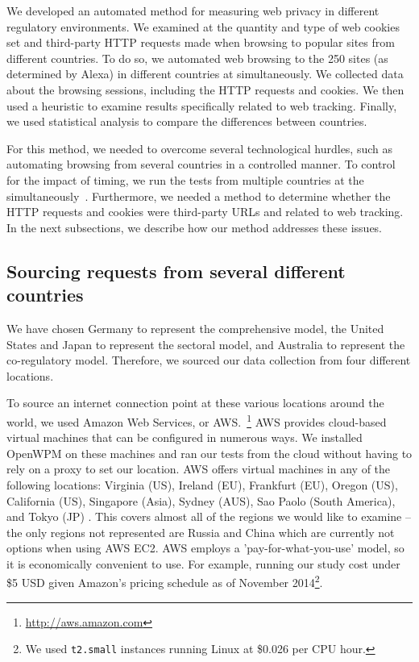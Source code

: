 \documentclass[conference]{IEEEtran}
\newcommand{\todo}[1]{}
\renewcommand{\todo}[1]{{\color{red} TODO: {#1}}}
\begin{document}
We developed an automated method for measuring web privacy in different regulatory environments.  We examined at the quantity and type of web cookies set and third-party HTTP requests made when browsing to popular sites from different countries.  To do so, we automated web browsing to the 250 sites (as determined by Alexa) in different countries at  simultaneously.  We collected data about the browsing sessions, including the HTTP requests and cookies.  We then used a heuristic to examine results specifically related to web tracking.  Finally, we used statistical analysis to compare the differences between countries.  

For this method, we needed to overcome several technological hurdles, such as automating browsing from several countries in a controlled manner. To control for the impact of timing, we run the tests from multiple countries at the simultaneously~\cite{guha2010challenges}. Furthermore, we needed a method to determine whether the HTTP requests and cookies were third-party URLs and related to web tracking. In the next subsections, we describe how our method addresses these issues.

\subsection{Sourcing requests from several different countries}

We have chosen Germany to represent the comprehensive model, the United States and Japan to represent the sectoral model, and Australia to represent the co-regulatory model. Therefore, we sourced our data collection from four different locations.

To source an internet connection point at these various locations around the world, we used Amazon Web Services, or AWS.~\footnote{\url{http://aws.amazon.com}} AWS provides cloud-based virtual machines that can be configured in numerous ways. We installed OpenWPM on these machines and ran our tests from the cloud without having to rely on a proxy to set our location. AWS offers virtual machines in any of the following locations: Virginia (US), Ireland (EU), Frankfurt (EU), Oregon (US), California (US), Singapore (Asia), Sydney (AUS), Sao Paolo (South America), and Tokyo (JP) \cite{amazonregion}. This covers almost all of the regions we would like to examine -- the only regions not represented are Russia and China which are currently not options when using AWS EC2. AWS employs a 'pay-for-what-you-use' model, so it is economically convenient to use. For example, running our study cost under \$5 USD given Amazon's pricing schedule as of November 2014\footnote{We used \texttt{t2.small} instances running Linux at \$0.026 per CPU hour.}.
\end{document}
